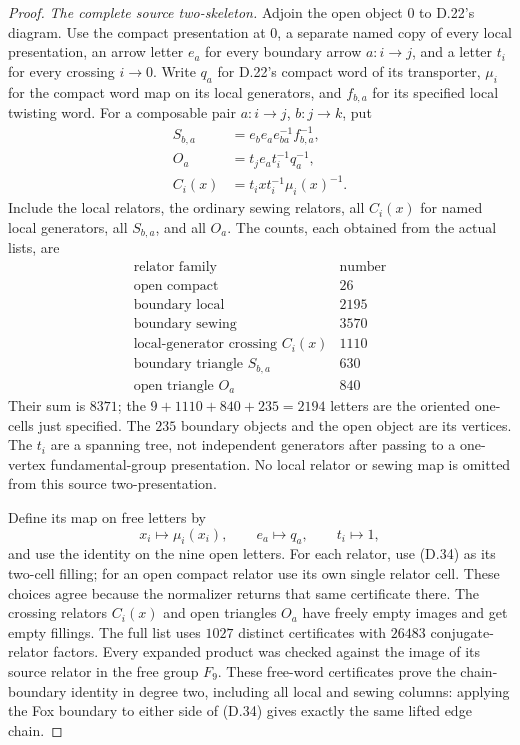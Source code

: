 \begin{proof}
\emph{The complete source two-skeleton.}
Adjoin the open object $0$ to D.22's diagram.
Use the compact presentation at $0$, a separate named
copy of every local presentation, an arrow letter
$e_a$ for every boundary arrow $a:i\to j$, and a
letter $t_i$ for every crossing $i\to0$.
Write $q_a$ for D.22's compact word of its transporter,
$\mu_i$ for the compact word map on its local generators,
and $f_{b,a}$ for its specified local twisting word.
For a composable pair $a:i\to j$, $b:j\to k$, put
\[
\begin{aligned}
 S_{b,a}&=e_b e_a e_{ba}^{-1}f_{b,a}^{-1},\\
 O_a&=t_j e_a t_i^{-1}q_a^{-1},\\
 C_i(x)&=t_i x t_i^{-1}\mu_i(x)^{-1}.
\end{aligned}                                                     \tag{D.35}
\]
Include the local relators, the ordinary sewing
relators, all $C_i(x)$ for named local generators,
all $S_{b,a}$, and all $O_a$.
The counts, each obtained from the actual lists, are
\[
\begin{array}{c|r}
\text{relator family}&\text{number}\\\hline
\text{open compact}&26\\
\text{boundary local}&2195\\
\text{boundary sewing}&3570\\
\text{local-generator crossing }C_i(x)&1110\\
\text{boundary triangle }S_{b,a}&630\\
\text{open triangle }O_a&840
\end{array}
\]
Their sum is $8371$; the $9+1110+840+235=2194$
letters are the oriented one-cells just specified.
The $235$ boundary objects and the open object are
its vertices.  The $t_i$ are a spanning tree, not
independent generators after passing to a one-vertex
fundamental-group presentation.
No local relator or sewing map is omitted from this
source two-presentation.

Define its map on free letters by
\[
  x_i\longmapsto\mu_i(x_i),\qquad
  e_a\longmapsto q_a,\qquad t_i\longmapsto1,
\]
and use the identity on the nine open letters.
For each relator, use (D.34) as its two-cell filling;
for an open compact relator use its own single
relator cell.  These choices agree because the
normalizer returns that same certificate there.
The crossing relators $C_i(x)$ and open triangles
$O_a$ have freely empty images and get empty fillings.
The full list uses $1027$ distinct certificates with
$26483$ conjugate-relator factors.  Every expanded
product was checked against the image of its source
relator in the free group $F_9$.
These free-word certificates prove the chain-boundary
identity in degree two, including all local and
sewing columns: applying the Fox boundary to either
side of (D.34) gives exactly the same lifted edge chain.


\end{proof}

